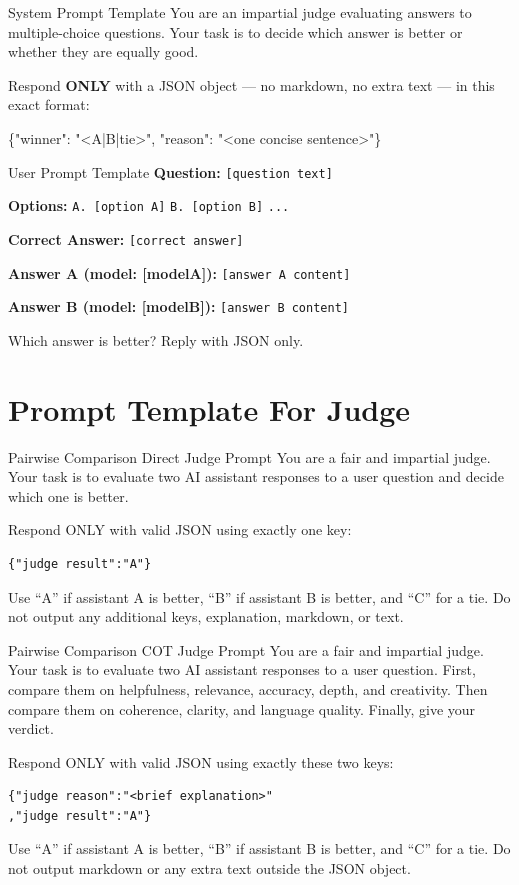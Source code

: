 \documentclass[11pt]{article}
\begin{document}
\begin{promptbox}{System Prompt Template}
You are an impartial judge evaluating answers to multiple-choice questions.  
Your task is to decide which answer is better or whether they are equally good.

Respond \textbf{ONLY} with a JSON object — no markdown, no extra text — in this exact format:

\{"winner": "<A|B|tie>", "reason": "<one concise sentence>"\}
\end{promptbox}


\begin{userbox}{User Prompt Template}
\textbf{Question:}
\texttt{[question text]}

\textbf{Options:}
\texttt{A. [option A]}
\texttt{B. [option B]}
\texttt{...}

\textbf{Correct Answer:}
\texttt{[correct answer]}

\textbf{Answer A (model: [modelA]):}
\texttt{[answer A content]}

\textbf{Answer B (model: [modelB]):}
\texttt{[answer B content]}

Which answer is better? Reply with JSON only.
\end{userbox}


\section{Prompt Template For Judge}
\label{appendix:prompt template}

\begin{userbox}{Pairwise Comparison Direct Judge Prompt}
You are a fair and impartial judge. Your task is to evaluate two AI assistant responses to a user question and decide which one is better.

Respond ONLY with valid JSON using exactly one key:
\begin{verbatim}
{"judge result":"A"}
\end{verbatim}

Use ``A'' if assistant A is better, ``B'' if assistant B is better, and ``C'' for a tie.
Do not output any additional keys, explanation, markdown, or text.
\end{userbox}

\begin{userbox}{Pairwise Comparison COT Judge Prompt}
You are a fair and impartial judge. Your task is to evaluate two AI assistant responses to a user question. First, compare them on helpfulness, relevance, accuracy, depth, and creativity. Then compare them on coherence, clarity, and language quality. Finally, give your verdict.

Respond ONLY with valid JSON using exactly these two keys:
\begin{verbatim}
{"judge reason":"<brief explanation>"
,"judge result":"A"}
\end{verbatim}

Use ``A'' if assistant A is better, ``B'' if assistant B is better, and ``C'' for a tie.
Do not output markdown or any extra text outside the JSON object.
\end{userbox}
\end{document}
